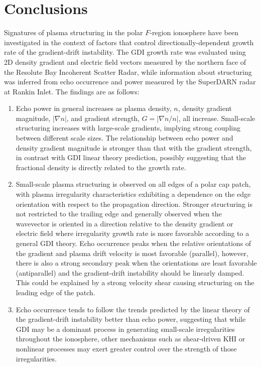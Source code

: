 \section{Conclusions}
\label{sec:p3conclusions}
Signatures of plasma structuring in the polar \(F\)-region ionosphere have been investigated in the context of factors that control directionally-dependent growth rate of the gradient-drift instability.  The GDI growth rate was evaluated using 2D density gradient and electric field vectors measured by the northern face of the Resolute Bay Incoherent Scatter Radar, while information about structuring was inferred from echo occurrence and power measured by the SuperDARN radar at Rankin Inlet.  The findings are as follows:
\begin{enumerate}
	\item Echo power in general increases as plasma density, \(n\), density gradient magnitude, \(|\nabla n|\), and gradient strength, \(G = |\nabla n/n|\), all increase.  Small-scale structuring increases with large-scale gradients, implying strong coupling between different scale sizes.  The relationship between echo power and density gradient magnitude is stronger than that with the gradient strength, in contrast with GDI linear theory prediction, possibly suggesting that the fractional density is directly related to the growth rate.
	\item Small-scale plasma structuring is observed on all edges of a polar cap patch, with plasma irregularity characteristics exhibiting a dependence on the edge orientation with respect to the propagation direction. Stronger structuring is not restricted to the trailing edge and generally observed when the wavevector is oriented in a direction relative to the density gradient or electric field where irregularity growth rate is more favorable according to a general GDI theory.  Echo occurrence peaks when the relative orientations of the gradient and plasma drift velocity is most favorable (parallel), however, there is also a strong secondary peak when the orientations are least favorable (antiparallel) and the gradient-drift instability should be linearly damped.  This could be explained by a strong velocity shear causing structuring on the leading edge of the patch.
	\item Echo occurrence tends to follow the trends predicted by the linear theory of the gradient-drift instability better than echo power, suggesting that while GDI may be a dominant process in generating small-scale irregularities throughout the ionosphere, other mechanisms such as shear-driven KHI or nonlinear processes may exert greater control over the strength of those irregularities.
\end{enumerate}



